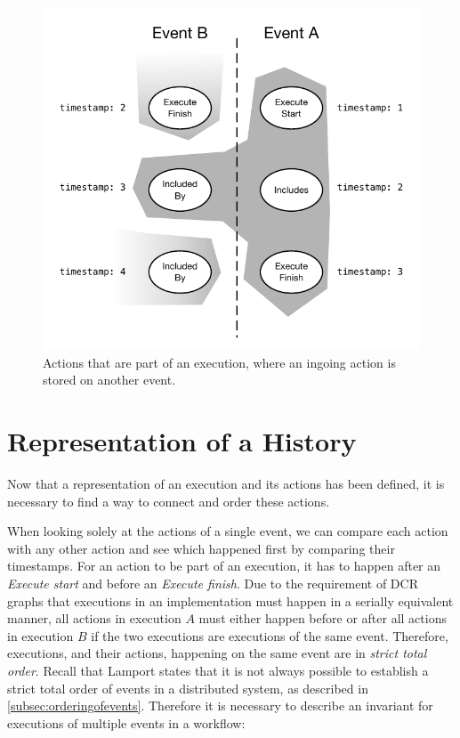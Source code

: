     \begin{figure}[H]
		\centering
		\includegraphics[height=0.35\textheight]{3local/images/execution.pdf}
		\caption{Actions that are part of an execution, where an ingoing action is stored on another event.}
		\label{fig:representing:execution}
	\end{figure}

    \section{Representation of a History}\label{sec:rep:hist}
	Now that a representation of an execution and its actions has been defined, it is necessary to find a way to connect and order these actions.
    
    \newpar When looking solely at the actions of a single event, we can compare each action with any other action and see which happened first by comparing their timestamps. For an action to be part of an execution, it has to happen after an \textit{Execute start} and before an \textit{Execute finish}. Due to the requirement of DCR graphs that executions in an implementation must happen in a serially equivalent manner, all actions in execution $A$ must either happen before or after all actions in execution $B$ if the two executions are executions of the same event. Therefore, executions, and their actions, happening on the same event are in  \textit{strict total order}. Recall that Lamport states that it is not always possible to establish a strict total order of events in a distributed system, as described in \autoref{subsec:orderingofevents}. Therefore it is necessary to describe an invariant for executions of multiple events in a workflow:
	
